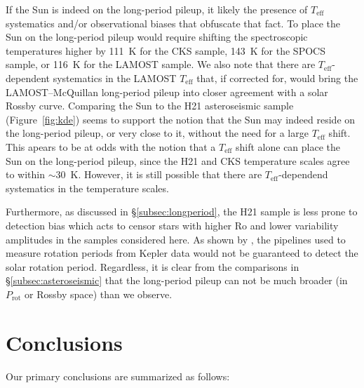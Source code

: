 \documentclass[trackchanges,twocolumn]{aastex631}
\newcommand{\lamostmcq}{LAMOST--McQuillan\xspace}
\newcommand{\hall}{H21\xspace}
\newcommand{\teff}{\ensuremath{T_{\mathrm{eff}}}\xspace}
\newcommand{\prot}{\ensuremath{P_\mathrm{rot}}\xspace}
\begin{document}
If the Sun is indeed on the long-period pileup, it likely the presence of \teff systematics and/or observational biases that obfuscate that fact. To place the Sun on the long-period pileup would require shifting the spectroscopic temperatures higher by 111~K for the CKS sample, 143~K for the SPOCS sample, or 116~K for the LAMOST sample. We also note that there are \teff-dependent systematics in the LAMOST \teff that, if corrected for, would bring the \lamostmcq long-period pileup into closer agreement with a solar Rossby curve. Comparing the Sun to the \hall asteroseismic sample (Figure~\ref{fig:kde}) seems to support the notion that the Sun may indeed reside on the long-period pileup, or very close to it, without the need for a large \teff shift. This apears to be at odds with the notion that a \teff shift alone can place the Sun on the long-period pileup, since the \hall and CKS temperature scales agree to within $\sim$30~K. However, it is still possible that there are \teff-dependend systematics in the temperature scales.

Furthermore, as discussed in \S\ref{subsec:longperiod}, the \hall sample is less prone to detection bias which acts to censor stars with higher Ro and lower variability amplitudes in the samples considered here. As shown by \citet{Aigrain2015}, the pipelines used to measure rotation periods from Kepler data would not be guaranteed to detect the solar rotation period. Regardless, it is clear from the comparisons in \S\ref{subsec:asteroseismic} that the long-period pileup can not be much broader (in \prot or Rossby space) than we observe.

\section{Conclusions} \label{sec:conclusions}

Our primary conclusions are summarized as follows:
\end{document}
